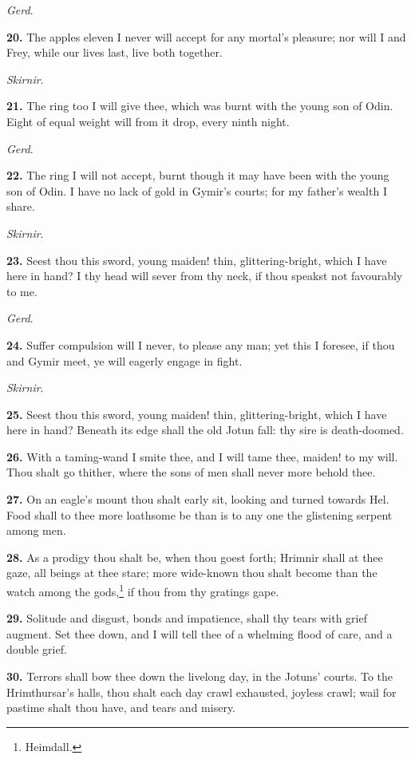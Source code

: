 \emph{Gerd}.

\textbf{20.} The apples eleven I never will accept for any mortal's pleasure;
nor will I and Frey, while our lives last, live both together.

\emph{Skirnir}.

\textbf{21.} The ring too I will give thee, which was burnt with the young
son of Odin. Eight of equal weight will from it drop, every ninth
night.

\emph{Gerd}.

\textbf{22.} The ring I will not accept, burnt though it may have been with
the young son of Odin. I have no lack of gold in Gymir's courts; for
my father's wealth I share.

\emph{Skirnir}.

\textbf{23.} Seest thou this sword, young maiden! thin, glittering-bright,
which I have here in hand? I thy head will sever from thy neck, if
thou speakst not favourably to me.

\emph{Gerd}.

\textbf{24.} Suffer compulsion will I never, to please any man; yet this I
foresee, if thou and Gymir meet, ye will eagerly engage in fight.

\emph{Skirnir}.

\textbf{25.} Seest thou this sword, young maiden! thin, glittering-bright,
which I have here in hand? Beneath its edge shall the old Jotun fall:
thy sire is death-doomed.

\textbf{26.} With a taming-wand I smite thee, and I will tame thee, maiden!
to my will. Thou shalt go thither, where the sons of men shall never
more behold thee.

\textbf{27.} On an eagle's mount thou shalt early sit, looking and turned
towards Hel. Food shall to thee more loathsome be than is to any one
the glistening serpent among men.

\textbf{28.} As a prodigy thou shalt be, when thou goest forth; Hrimnir shall
at thee gaze, all beings at thee stare; more wide-known thou shalt
become than the watch among the gods,\footnote{Heimdall.} if thou from thy gratings
gape.

\textbf{29.} Solitude and disgust, bonds and impatience, shall thy tears with
grief augment. Set thee down, and I will tell thee of a whelming flood
of care, and a double grief.

\textbf{30.} Terrors shall bow thee down the livelong day, in the Jotuns'
courts. To the Hrimthursar's halls, thou shalt each day crawl
exhausted, joyless crawl; wail for pastime shalt thou have, and tears
and misery.

